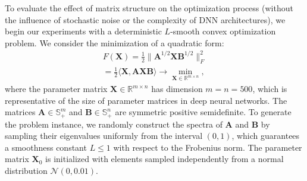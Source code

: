 \documentclass[letterpaper]{article} %
\begin{document}
To evaluate the effect of matrix structure on the optimization process (without the influence of stochastic noise or the complexity of DNN architectures), we begin our experiments with a deterministic $L$-smooth convex optimization problem. We consider the minimization of a quadratic form:
\begin{multline}
F(\mathbf{X}) = \frac{1}{2} \|\mathbf{A}^{1/2} \mathbf{X} \mathbf{B}^{1/2}\|_F^2 \\
= \frac{1}{2} \langle \mathbf{X}, \mathbf{A} \mathbf{X} \mathbf{B} \rangle \to \min_{\mathbf{X} \in \mathbb{R}^{m \times n}},
\label{eq:synthetic_problem}
\end{multline}
where the parameter matrix $\mathbf{X} \in \mathbb{R}^{m \times n}$ has dimension $m = n = 500$, which is representative of the size of parameter matrices in deep neural networks. The matrices $\mathbf{A} \in \mathbb{S}_+^m$ and $\mathbf{B} \in \mathbb{S}_+^n$ are symmetric positive semidefinite. To generate the problem instance, we randomly construct the spectra of $\mathbf{A}$ and $\mathbf{B}$ by sampling their eigenvalues uniformly from the interval $(0, 1)$, which guarantees a smoothness constant $L \le 1$ with respect to the Frobenius norm. The parameter matrix $\mathbf{X}_0$ is initialized with elements sampled independently from a normal distribution $\mathcal{N}(0, 0.01)$.
\end{document}
